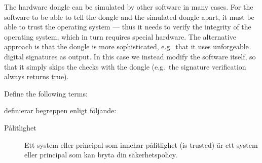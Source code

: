 \documentclass[svv,addpoints]{miunexam}
\begin{document}
\begin{questions}
\begin{solution}
  The hardware dongle can be simulated by other software in many cases.
  For the software to be able to tell the dongle and the simulated dongle 
  apart, it must be able to trust the operating system --- thus it needs to 
  verify the integrity of the operating system, which in turn requires special 
  hardware.
  The alternative approach is that the dongle is more sophisticated, e.g.\ that 
  it uses unforgeable digital signatures as output.
  In this case we instead modify the software itself, so that it simply skips 
  the checks with the dongle (e.g.\ the signature verification always returns 
  true).
\end{solution}



\question\label{q:foundations:E}
  Define the following terms:

  \begin{solution}
    \citet[ss.\ 13--14]{Anderson2008sea} definierar begreppen enligt följande:
    \begin{description}
      \item[Pålitlighet] Ett system eller principal som innehar pålitlighet 
        (\foreignlanguage{english}{is trusted}) är ett system eller principal 
        som kan bryta din säkerhetspolicy.


\end{description}
\end{solution}
\end{questions}
\end{document}
